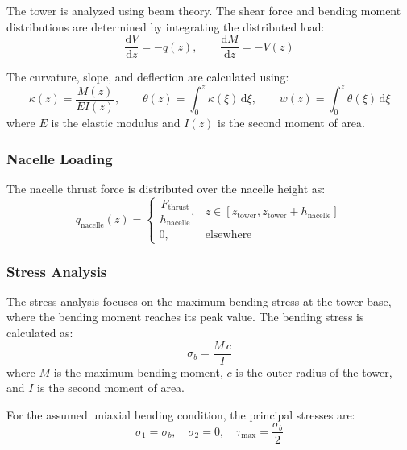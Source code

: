 \documentclass[11pt]{article}
\begin{document}
The tower is analyzed using beam theory. The shear force and bending moment distributions are determined by integrating the distributed load:
\begin{equation}
 \frac{\mathrm{d}V}{\mathrm{d}z} = -q(z), \qquad \frac{\mathrm{d}M}{\mathrm{d}z} = -V(z)
\label{eq:shear_moment}
\end{equation}

The curvature, slope, and deflection are calculated using:
\begin{equation}
 \kappa(z) = \frac{M(z)}{E I(z)}, \qquad \theta(z) = \int_0^{z} \kappa(\xi)\,\mathrm{d}\xi, \qquad w(z) = \int_0^{z} \theta(\xi)\,\mathrm{d}\xi
\label{eq:deflection}
\end{equation}
where $E$ is the elastic modulus and $I(z)$ is the second moment of area.

\subsubsection{Nacelle Loading}

The nacelle thrust force is distributed over the nacelle height as:
\begin{equation}
 q_{\text{nacelle}}(z) = \begin{cases} \dfrac{F_{\text{thrust}}}{h_{\text{nacelle}}}, & z\in[z_{\text{tower}}, z_{\text{tower}}+h_{\text{nacelle}}] \\ 0, & \text{elsewhere} \end{cases}
\label{eq:nacelle_load}
\end{equation}

\subsubsection{Stress Analysis}

The stress analysis focuses on the maximum bending stress at the tower base, where the bending moment reaches its peak value. The bending stress is calculated as:
\begin{equation}
 \sigma_b = \frac{M\,c}{I}
\label{eq:bending_stress}
\end{equation}
where $M$ is the maximum bending moment, $c$ is the outer radius of the tower, and $I$ is the second moment of area.

For the assumed uniaxial bending condition, the principal stresses are:
\begin{equation}
 \sigma_1 = \sigma_b, \quad \sigma_2 = 0, \quad \tau_{\max} = \frac{\sigma_b}{2}
\label{eq:principal_stresses}
\end{equation}
\end{document}
